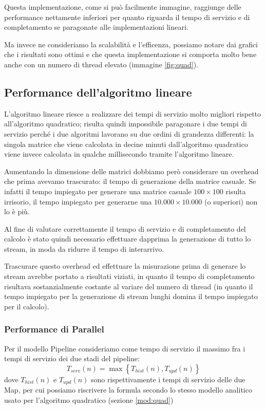\documentclass[a4paper,10pt]{article}
\begin{document}
Questa implementazione, come si pu\`o facilmente immagine, raggiunge delle performance nettamente inferiori per quanto riguarda il tempo di servizio e di completamento se paragonate alle implementazioni lineari.

Ma invece ne consideriamo la scalabilit\`a e l'efficenza, possiamo notare dai grafici che i risultati sono ottimi e che questa implementazione si comporta molto bene anche con un numero di thread elevato (immagine \ref{fig:quad}).

\subsection{Performance dell'algoritmo lineare}

L'algoritmo lineare riesce a realizzare dei tempi di servizio molto migliori rispetto all'algoritmo quadratico; risulta quindi impossibile paragonare i due tempi di servizio perch\'e i due algoritmi lavorano su due ordini di grandezza differenti: la singola matrice che viene calcolata in decine minuti dall'algoritmo quadratico viene invece calcolata in qualche millisecondo tramite l'algoritmo lineare.

Aumentando la dimensione delle matrici dobbiamo per\`o considerare un overhead che prima avevamo trascurato: il tempo di generazione della matrice casuale. Se infatti il tempo impiegato per generare una matrice casuale $100 \times 100$ risulta irrisorio, il tempo impiegato per generarne una $10.000 \times 10.000$ (o superiori) non lo \`e pi\`u.

Al fine di valutare correttamente il tempo di servizio e di completamento del calcolo \`e stato quindi necessario effettuare dapprima la generazione di tutto lo stream, in moda da ridurre il tempo di interarrivo.

Trascurare questo overhead ed effettuare la misurazione prima di generare lo stream avrebbe portato a risultati viziati, in quanto il tempo di completamento risultava sostanzialmente costante al variare del numero di thread (in quanto il tempo impiegato per la generazione di stream lunghi domina il tempo impiegato per il calcolo).

\subsubsection{Performance di \textsf{Parallel}}

Per il modello \textsf{Pipeline} consideriamo come tempo di servizio il massimo fra i tempi di servizio dei due stadi del pipeline: $$T_{serv}(n) = \max \left\lbrace T_{hist}(n), T_{upd}(n) \right\rbrace$$
dove $T_{hist}(n)$ e $T_{upd}(n)$ sono rispettivamente i tempi di servizio delle due \textsf{Map}, per cui possiamo riscrivere la formula secondo lo stesso modello analitico usato per l'algoritmo quadratico (sezione \ref{mod:quad})
\end{document}
